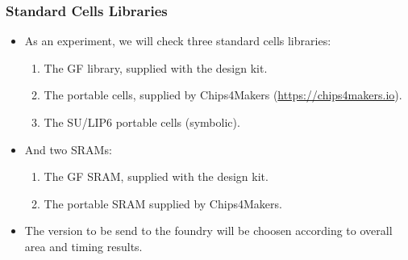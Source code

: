 \documentclass[10pt,aspectratio=169,presentation]{beamer}
\begin{document}
   \begin{frame}
     \frametitle{Standard Cells Libraries}
     \begin{itemize}
       \setlength\itemsep{1.0\baselineskip}
       \item As an experiment, we will check three standard cells libraries:
             \begin{enumerate}
               \setlength\itemsep{1.0\baselineskip}
               \item The GF library, supplied with the design kit.
               \item The portable cells, supplied by Chips4Makers (\url{https://chips4makers.io}).
               \item The SU/LIP6 portable cells (symbolic).
             \end{enumerate}
       \item And two SRAMs:
             \begin{enumerate}
               \setlength\itemsep{1.0\baselineskip}
               \item The GF SRAM, supplied with the design kit.
               \item The portable SRAM supplied by Chips4Makers.
             \end{enumerate}
       \item The version to be send to the foundry will be choosen according
             to overall area and timing results.
     \end{itemize}
   \end{frame}


 
\end{document}
